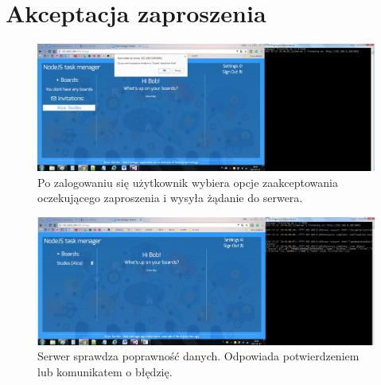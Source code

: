 \documentclass[12pt]{report}
\begin{document}
\section{Akceptacja zaproszenia}
\begin{figure}[!hb]
\centering
\includegraphics[width=\textwidth,height=\textheight,keepaspectratio]{81.png}
\captionsetup{labelformat=empty}
\caption[]{Po zalogowaniu się użytkownik wybiera opcje zaakceptowania oczekującego zaproszenia i wysyła żądanie do serwera.}
\end{figure}
\begin{figure}[!hb]
\centering
\includegraphics[width=\textwidth,height=\textheight,keepaspectratio]{82.png}
\captionsetup{labelformat=empty}
\caption[]{Serwer sprawdza poprawność danych. Odpowiada potwierdzeniem lub komunikatem o błędzię.}
\end{figure}
\end{document}
